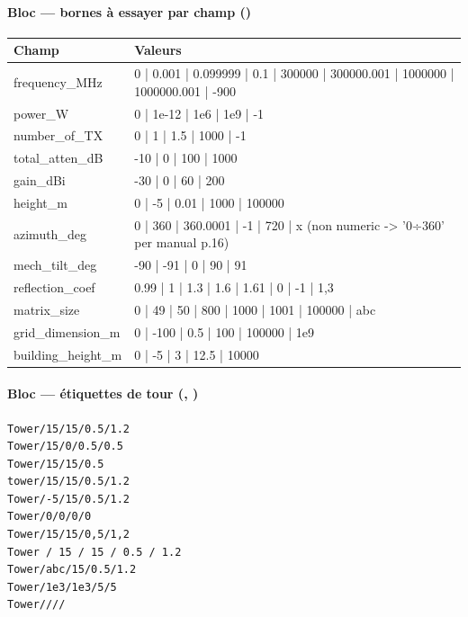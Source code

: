 \paragraph*{Bloc  --- bornes à essayer par champ ()}
\begin{center}\scriptsize\renewcommand{\arraystretch}{1.1}\begin{tabular}{@{}lp{12.2cm}@{}}\toprule \textbf{Champ} & \textbf{Valeurs} \\\midrule
frequency\_MHz & 0 | 0.001 | 0.099999 | 0.1 | 300000 | 300000.001 | 1000000 | 1000000.001 | -900\\
power\_W & 0 | 1e-12 | 1e6 | 1e9 | -1\\
number\_of\_TX & 0 | 1 | 1.5 | 1000 | -1\\
total\_atten\_dB & -10 | 0 | 100 | 1000\\
gain\_dBi & -30 | 0 | 60 | 200\\
height\_m & 0 | -5 | 0.01 | 1000 | 100000\\
azimuth\_deg & 0 | 360 | 360.0001 | -1 | 720 | x (non numeric -> '0÷360' per manual p.16)\\
mech\_tilt\_deg & -90 | -91 | 0 | 90 | 91\\
reflection\_coef & 0.99 | 1 | 1.3 | 1.6 | 1.61 | 0 | -1 | 1,3\\
matrix\_size & 0 | 49 | 50 | 800 | 1000 | 1001 | 100000 | abc\\
grid\_dimension\_m & 0 | -100 | 0.5 | 100 | 100000 | 1e9\\
building\_height\_m & 0 | -5 | 3 | 12.5 | 10000\\
\bottomrule\end{tabular}\end{center}
\paragraph*{Bloc  --- étiquettes de tour (, )}\vspace{-2pt}
\begin{Verbatim}[frame=single,framesep=1.5mm,fontsize=\footnotesize,rulecolor=\color{accent}]
Tower/15/15/0.5/1.2
Tower/15/0/0.5/0.5
Tower/15/15/0.5
tower/15/15/0.5/1.2
Tower/-5/15/0.5/1.2
Tower/0/0/0/0
Tower/15/15/0,5/1,2
Tower / 15 / 15 / 0.5 / 1.2
Tower/abc/15/0.5/1.2
Tower/1e3/1e3/5/5
Tower////
\end{Verbatim}
